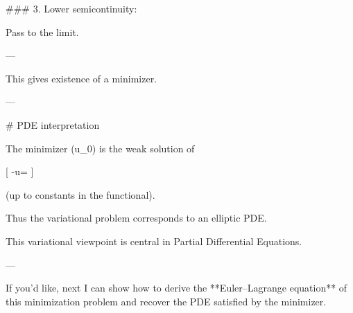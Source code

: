 ### 3. Lower semicontinuity:

Pass to the limit.

---

This gives existence of a minimizer.

---

# PDE interpretation

The minimizer (u_0) is the weak solution of

[
-\Delta u=
]

(up to constants in the functional).

Thus the variational problem corresponds to an elliptic PDE.

This variational viewpoint is central in Partial Differential Equations.

---

If you'd like, next I can show how to derive the **Euler–Lagrange equation** of this minimization problem and recover the PDE satisfied by the minimizer.

